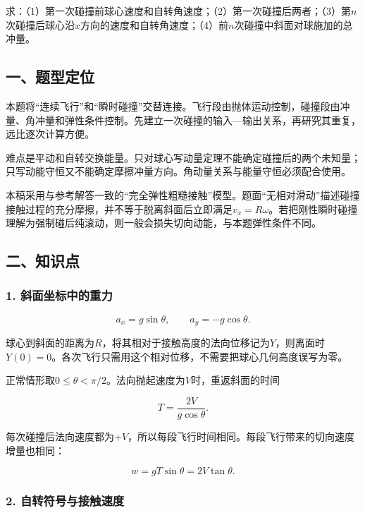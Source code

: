 \documentclass[12pt,a4paper,fontset=fandol]{ctexart}
\begin{document}
求：（1）第一次碰撞前球心速度和自转角速度；（2）第一次碰撞后两者；（3）第\(n\)次碰撞后球心沿\(x\)方向的速度和自转角速度；（4）前\(n\)次碰撞中斜面对球施加的总冲量。

\subsection{一、题型定位}\label{ux4e00ux9898ux578bux5b9aux4f4d-2}

本题将``连续飞行''和``瞬时碰撞''交替连接。飞行段由抛体运动控制，碰撞段由冲量、角冲量和弹性条件控制。先建立一次碰撞的输入---输出关系，再研究其重复，远比逐次计算方便。

难点是平动和自转交换能量。只对球心写动量定理不能确定碰撞后的两个未知量；只写动能守恒又不能确定摩擦冲量方向。角动量关系与能量守恒必须配合使用。

本稿采用与参考解答一致的``完全弹性粗糙接触''模型。题面``无相对滑动''描述碰撞接触过程的充分摩擦，并不等于脱离斜面后立即满足\(v_x=R\omega\)。若把刚性瞬时碰撞理解为强制碰后纯滚动，则一般会损失切向动能，与本题弹性条件不同。

\subsection{二、知识点}\label{ux4e8cux77e5ux8bc6ux70b9-2}

\subsubsection{1.
斜面坐标中的重力}\label{ux659cux9762ux5750ux6807ux4e2dux7684ux91cdux529b}

\[
a_x=g\sin\theta,\qquad a_y=-g\cos\theta.
\]

球心到斜面的距离为\(R\)，将其相对于接触高度的法向位移记为\(Y\)，则离面时\(Y(0)=0\)。各次飞行只需用这个相对位移，不需要把球心几何高度误写为零。

正常情形取\(0\leq\theta<\pi/2\)。法向抛起速度为\(V\)时，重返斜面的时间

\[
T=\frac{2V}{g\cos\theta}.
\]

每次碰撞后法向速度都为\(+V\)，所以每段飞行时间相同。每段飞行带来的切向速度增量也相同：

\[
w=gT\sin\theta=2V\tan\theta.
\]

\subsubsection{2.
自转符号与接触速度}\label{ux81eaux8f6cux7b26ux53f7ux4e0eux63a5ux89e6ux901fux5ea6}
\end{document}
